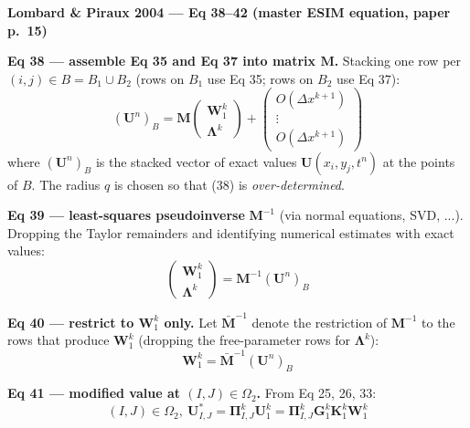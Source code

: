 \textbf{Lombard \& Piraux 2004 --- Eq 38--42 (master ESIM equation, paper p.\ 15)}

\medskip

\textbf{Eq 38 --- assemble Eq 35 and Eq 37 into matrix
$\boldsymbol{M}$.}
Stacking one row per $(i, j) \in B = B_1 \cup B_2$ (rows on $B_1$
use Eq 35; rows on $B_2$ use Eq 37):
\begin{equation*}
  (\boldsymbol{U}^n)_B
  = \boldsymbol{M}
    \begin{pmatrix} \boldsymbol{W}_1^k \\ \boldsymbol{\Lambda}^k \end{pmatrix}
  + \begin{pmatrix} O(\Delta x^{k+1}) \\ \vdots \\ O(\Delta x^{k+1}) \end{pmatrix}
  \tag{38}
\end{equation*}
where $(\boldsymbol{U}^n)_B$ is the stacked vector of exact values
$\boldsymbol{U}(x_i, y_j, t^n)$ at the points of $B$. The radius
$q$ is chosen so that (38) is \emph{over-determined}.

\medskip

\textbf{Eq 39 --- least-squares pseudoinverse} $\boldsymbol{M}^{-1}$
(via normal equations, SVD, ...). Dropping the Taylor remainders
and identifying numerical estimates with exact values:
\begin{equation*}
  \begin{pmatrix} \boldsymbol{W}_1^k \\ \boldsymbol{\Lambda}^k \end{pmatrix}
  = \boldsymbol{M}^{-1} (\boldsymbol{U}^n)_B
  \tag{39}
\end{equation*}

\textbf{Eq 40 --- restrict to $\boldsymbol{W}_1^k$ only.} Let
$\bar{\boldsymbol{M}}^{-1}$ denote the restriction of
$\boldsymbol{M}^{-1}$ to the rows that produce
$\boldsymbol{W}_1^k$ (dropping the free-parameter rows for
$\boldsymbol{\Lambda}^k$):
\begin{equation*}
  \boldsymbol{W}_1^k = \bar{\boldsymbol{M}}^{-1} (\boldsymbol{U}^n)_B
  \tag{40}
\end{equation*}

\medskip

\textbf{Eq 41 --- modified value at $(I, J) \in \Omega_2$.} From
Eq 25, 26, 33:
\begin{equation*}
  (I, J) \in \Omega_2,\
  \boldsymbol{U}^*_{I,J}
  = \boldsymbol{\Pi}_{I,J}^k \boldsymbol{U}_1^k
  = \boldsymbol{\Pi}_{I,J}^k \boldsymbol{G}_1^k \boldsymbol{K}_1^k \boldsymbol{W}_1^k
  \tag{41}
\end{equation*}

